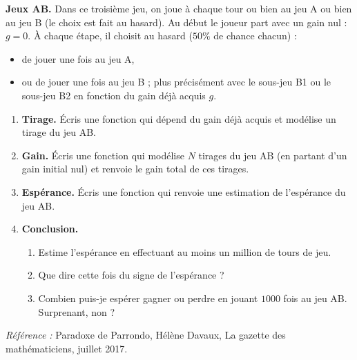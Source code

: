 \documentclass[11pt,class=report,crop=false]{standalone}
\begin{document}


\begin{activite}


\textbf{Jeux AB.} Dans ce troisième jeu, on joue à chaque tour ou bien au jeu A ou bien au jeu B (le choix est fait au hasard). 
Au début le joueur part avec un gain nul : $g=0$. 
\`A chaque étape, il choisit au hasard ($50\%$ de chance chacun) :
\begin{itemize}
  \item de jouer une fois au jeu A,
  \item ou de jouer une fois au jeu B ; plus précisément avec le sous-jeu B1 ou le sous-jeu B2 en fonction du gain déjà acquis $g$.
\end{itemize}

\begin{enumerate}
  \item \textbf{Tirage.}
  \'Ecris une fonction  qui dépend du gain déjà acquis et modélise un tirage du jeu AB.
  
  \item \textbf{Gain.} \'Ecris une fonction  qui modélise $N$ tirages du jeu AB (en partant d'un gain initial nul) et renvoie le gain total de ces tirages.
  
  \item \textbf{Espérance.} \'Ecris une fonction  qui renvoie une estimation de l'espérance du jeu AB.
  
  \item \textbf{Conclusion.}
  \begin{enumerate}
    \item Estime l'espérance en effectuant au moins un million de tours de jeu.
    \item Que dire cette fois du signe de l'espérance ?
    \item Combien puis-je espérer gagner ou perdre en jouant $1000$ fois au jeu AB. Surprenant, non ?
  \end{enumerate}

\end{enumerate}
\end{activite}


\emph{Référence :} \og{}Paradoxe de Parrondo\fg{}, Hélène Davaux, La gazette des mathématiciens, juillet 2017.
\end{document}

